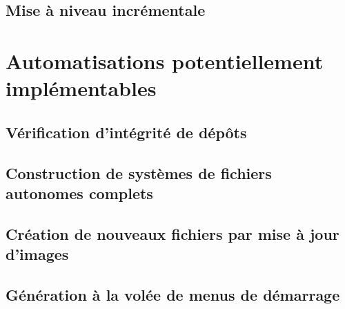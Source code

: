 \ml
{\subsection{\todo}}
{\subsection{Mise à niveau incrémentale}}

\ml
{\section{\todo}}
{\section{Automatisations potentiellement implémentables}}

\ml
{\subsection{\todo}}
{\subsection{Vérification d’intégrité de dépôts}}

\ml
{\subsection{\todo}}
{\subsection{Construction de systèmes de fichiers autonomes complets}}

\ml
{\subsection{\todo}}
{\subsection{Création de nouveaux fichiers par mise à jour d’images}}

\ml
{\subsection{\todo}}
{\subsection{Génération à la volée de menus de démarrage}}

